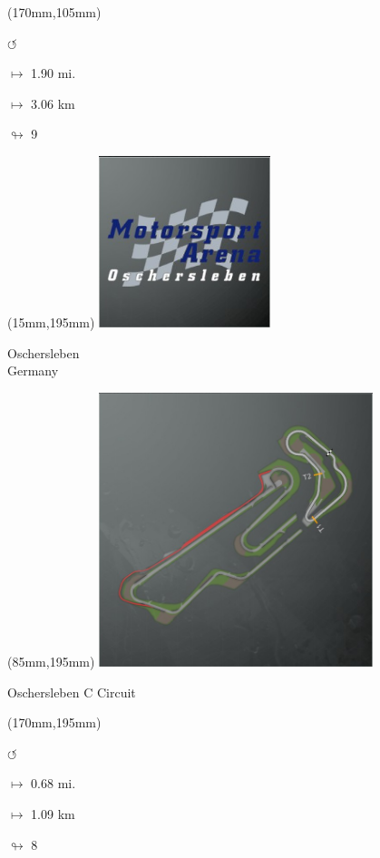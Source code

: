 \begin{textblock*}{30mm}(170mm,105mm)%
\par \Huge$\circlearrowleft$
\Large
\par$\mapsto$ 1.90 mi.
\par$\mapsto$ 3.06 km
\par$\looparrowright$ 9
\end{textblock*}
\begin{textblock*}{60mm}(15mm,195mm)%
\includegraphics[width=50mm]{LG/2015-05-20_00090.png}
\par Oschersleben\\ Germany
\end{textblock*}
\begin{textblock*}{80mm}(85mm,195mm)%
\includegraphics[width=80mm]{TR/2015-05-20_00047.png}
\centerline{Oschersleben C Circuit}
\end{textblock*}
\begin{textblock*}{30mm}(170mm,195mm)%
\par \Huge$\circlearrowleft$
\Large
\par$\mapsto$ 0.68 mi.
\par$\mapsto$ 1.09 km
\par$\looparrowright$ 8
\end{textblock*}
\null\newpage

